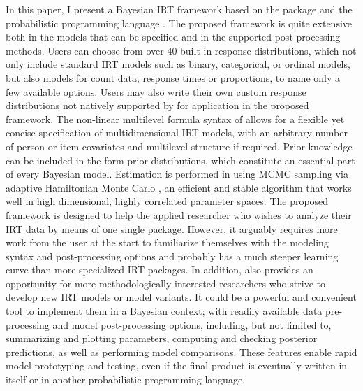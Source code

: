 \documentclass[
]{jss}
\begin{document}
In this paper, I present a Bayesian IRT framework based on the
 package  \citep{brms1, brms2} and the
probabilistic programming language 
\citep{carpenter2017}. The proposed framework is quite extensive both in
the models that can be specified and in the supported post-processing
methods. Users can choose from over 40 built-in response distributions,
which not only include standard IRT models such as binary, categorical,
or ordinal models, but also models for count data, response times or
proportions, to name only a few available options. Users may also write
their own custom response distributions not natively supported by
 for application in the proposed framework. The non-linear
multilevel formula syntax of  allows for a flexible yet
concise specification of multidimensional IRT models, with an arbitrary
number of person or item covariates and multilevel structure if
required. Prior knowledge can be included in the form prior
distributions, which constitute an essential part of every Bayesian
model. Estimation is performed in  using MCMC sampling
via adaptive Hamiltonian Monte Carlo \citep{hoffman2014, stanM2019}, an
efficient and stable algorithm that works well in high dimensional,
highly correlated parameter spaces. The proposed framework is designed
to help the applied researcher who wishes to analyze their IRT data by
means of one single package. However, it arguably requires more work
from the user at the start to familiarize themselves with the modeling
syntax and post-processing options and probably has a much steeper
learning curve than more specialized IRT packages. In addition,
 also provides an opportunity for more methodologically
interested researchers who strive to develop new IRT models or model
variants. It could be a powerful and convenient tool to implement them
in a Bayesian context; with readily available data pre-processing and
model post-processing options, including, but not limited to,
summarizing and plotting parameters, computing and checking posterior
predictions, as well as performing model comparisons. These features
enable rapid model prototyping and testing, even if the final product is
eventually written in  itself or in another probabilistic
programming language.
\end{document}
